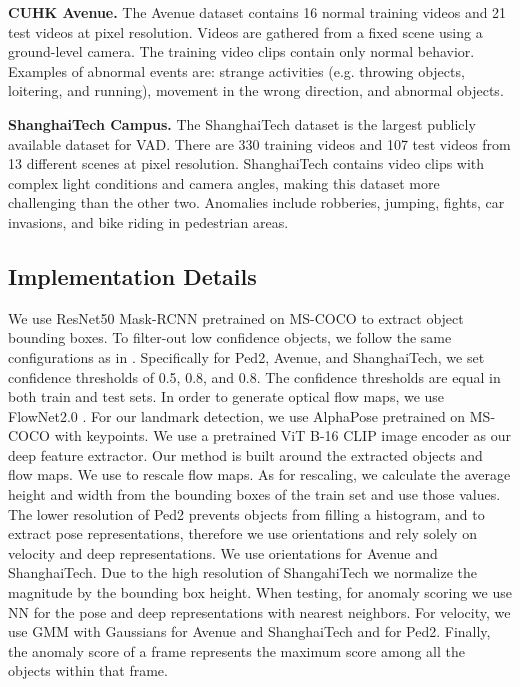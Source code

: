 \documentclass[10pt,twocolumn,letterpaper]{article}
\begin{document}
\textbf{CUHK Avenue.} The Avenue dataset \cite{avenue} contains 16 normal training videos and 21 test videos at  pixel resolution. Videos are gathered from a fixed scene using a ground-level camera. The training video clips contain only normal behavior. Examples of abnormal events are: strange activities (e.g. throwing objects, loitering, and running), movement in the wrong direction, and abnormal objects.

\textbf{ShanghaiTech Campus.} The ShanghaiTech dataset \cite{shanghaitech} is the largest publicly available dataset for VAD. There are 330 training videos and 107 test videos from 13 different scenes at  pixel resolution. ShanghaiTech contains video clips with complex light conditions and camera angles, making this dataset more challenging than the other two. Anomalies include robberies, jumping, fights, car invasions, and bike riding in pedestrian areas.

\subsection{Implementation Details}
We use ResNet50 Mask-RCNN \cite{mask_rcnn} pretrained on MS-COCO \cite{mscoco} to extract object bounding boxes. To filter-out low confidence objects, we follow the same configurations as in \cite{Georgescu2021AnomalyDI}. Specifically for Ped2, Avenue, and ShanghaiTech, we set confidence thresholds of 0.5, 0.8, and 0.8. The confidence thresholds are equal in both train and test sets. In order to generate optical flow maps, we use FlowNet2.0 \cite{flownet2}. For our landmark detection, we use AlphaPose \cite{alphapose} pretrained on MS-COCO with  keypoints. We use a pretrained ViT B-16 \cite{vision_transformer} CLIP \cite{clip} image encoder as our deep feature extractor. Our method is built around the extracted objects and flow maps. We use  to rescale flow maps. As for  rescaling, we calculate the average height and width from the bounding boxes of the train set and use those values. The lower resolution of Ped2 prevents objects from filling a histogram, and to extract pose representations, therefore we use  orientations and rely solely on velocity and deep representations. We use  orientations for Avenue and ShanghaiTech. Due to the high resolution of ShangahiTech we normalize the magnitude by the bounding box height. When testing, for anomaly scoring we use NN for the pose and deep representations with  nearest neighbors. For velocity, we use GMM with  Gaussians for Avenue and ShanghaiTech and  for Ped2. Finally, the anomaly score of a frame represents the maximum score among all the objects within that frame.
\end{document}
